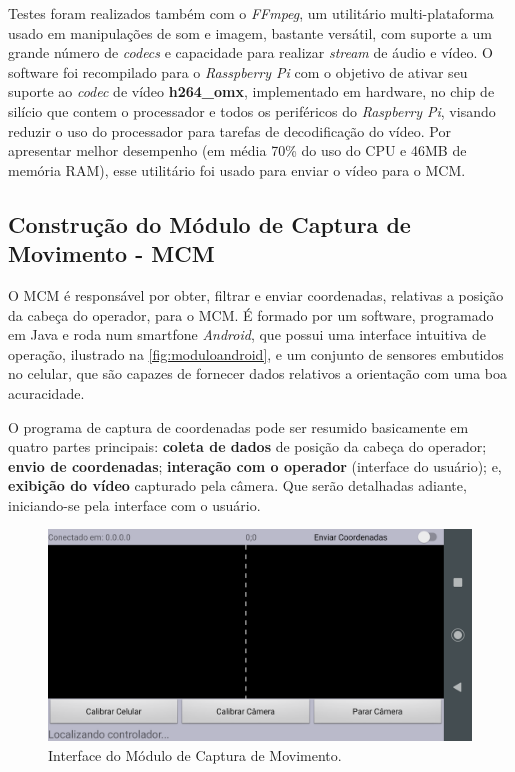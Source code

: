 Testes foram realizados também com o \textit{FFmpeg}, um utilitário multi-plataforma usado em manipulações de som e imagem, bastante versátil, com suporte a um grande número de \textit{codecs} e capacidade para realizar \textit{stream} de áudio e vídeo. O software foi recompilado para o \textit{Rasspberry Pi} com o objetivo de ativar seu suporte ao \textit{codec} de vídeo \textbf{h264\_omx}, implementado em hardware, no chip de silício que contem o processador e todos os periféricos do \textit{Raspberry Pi}, visando reduzir o uso do processador para tarefas de decodificação do vídeo. Por apresentar melhor desempenho (em média 70\% do uso do CPU e 46MB de memória RAM), esse utilitário foi usado para enviar o vídeo para o MCM.



\subsection{Construção do Módulo de Captura de Movimento - MCM}
\label{subsec:assemmodcapmov}

O MCM é responsável por obter, filtrar e enviar coordenadas, relativas a posição da cabeça do operador, para o MCM. É formado por um software, programado em Java e roda num smartfone \textit{Android}, que possui uma interface intuitiva de operação, ilustrado na \autoref{fig:moduloandroid}, e um conjunto de sensores embutidos no celular, que são capazes de fornecer dados relativos a orientação com uma boa acuracidade. \par

O programa de captura de coordenadas pode ser resumido basicamente em quatro partes principais: \textbf{coleta de dados} de posição da cabeça do operador; \textbf{envio de coordenadas}; \textbf{interação com o operador} (interface do usuário); e, \textbf{exibição do vídeo} capturado pela câmera. Que serão detalhadas adiante, iniciando-se pela  interface com o usuário.\par


\begin{figure}[H]
	\centering
	\includegraphics[width=1\textwidth]{figuras/modulo_android_1.png}
	\caption{Interface do Módulo de Captura de Movimento.}
	\label{fig:moduloandroid}
\end{figure}

